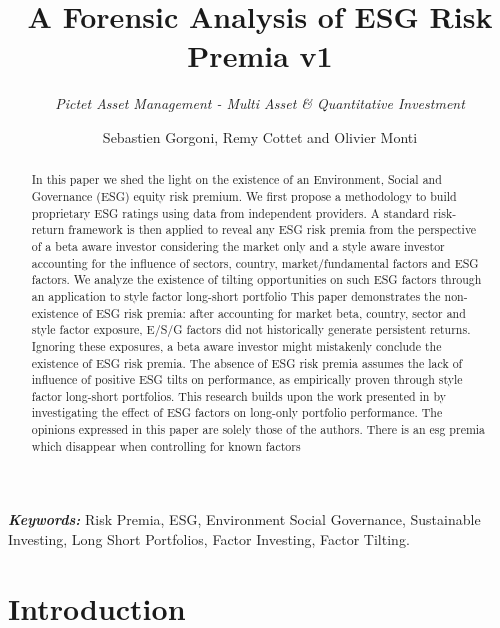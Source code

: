 \documentclass[11pt,a4paper]{article}
\title{\Large\textbf{\color{pam_green}A Forensic Analysis of ESG Risk Premia v1}}
\subtitle{\color{black}\textit{Pictet Asset Management - Multi Asset \& Quantitative Investment}}
\author{Sebastien Gorgoni, Remy Cottet and Olivier Monti}
\providecommand{\keywords}[1]
{
	\small	
	\textbf{\textit{Keywords:}} #1
}
\begin{document}

{\let\newpage\relax\maketitle}
\thispagestyle{empty}

\begin{abstract}
    \noindent
    In this paper we shed the light on the existence of an Environment, Social and Governance (ESG) equity risk premium. We first propose a methodology to build proprietary ESG ratings using data from independent providers.
    A standard risk-return framework is then applied to reveal any ESG risk premia from the perspective  of a beta aware investor considering the market only and a style aware investor accounting for the influence of sectors, country, market/fundamental factors and ESG factors.
    We analyze the existence of tilting opportunities on such ESG factors through an application to style factor long-short portfolio  
    This paper demonstrates the non-existence of ESG risk premia: after accounting for market beta, country, sector and style factor exposure, E/S/G factors did not historically generate persistent returns.
    Ignoring these exposures, a beta aware investor might mistakenly conclude the existence of ESG risk premia.
    The absence of ESG risk premia assumes the lack of influence of positive ESG tilts on performance, as empirically proven through style factor long-short portfolios.     
    This research  builds upon the work presented in  by investigating the effect of ESG factors on long-only portfolio performance.
    The opinions expressed in this paper are solely those of the authors.
    There is an esg premia which disappear when controlling for known factors
    
\end{abstract}

\keywords{Risk Premia, ESG, Environment Social Governance, Sustainable Investing, Long Short Portfolios, Factor Investing, Factor Tilting.}

\clearpage

\tableofcontents

\clearpage

\section{Introduction}\label{sec:intro}
\end{document}
